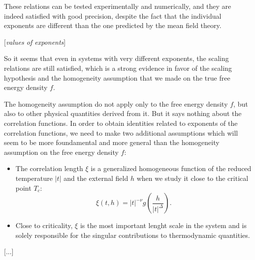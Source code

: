 These relations can be tested experimentally and numerically, and they are indeed satisfied with good precision, despite the fact that the individual exponents are different than the one predicted by the mean field theory.

    [\textit{values of exponents}]

So it seems that even in systems with very different exponents, the scaling relations are still satisfied, which is a strong evidence in favor of the scaling hypothesis and the homogeneity assumption that we made on the true free energy density \(f\).

The homogeneity assumption do not apply only to the free energy density \(f\), but also to other physical quantities derived from it. But it says nothing about the correlation functions. In order to obtain identities related to exponents of the correlation functions, we need to make two additional assumptions which will seem to be more foundamental and more general than the homogeneity assumption on the free energy density \(f\):
\begin{itemize}
    \item The correlation length \(\xi\) is a generalized homogeneous function of the reduced temperature \(\vert t \vert\) and the external field \(h\) when we study it close to the critical point \(T_c\):
          \[
              \xi(t,h) = \vert t \vert^{-\nu} g\left(\frac{h}{\vert t \vert^{\Delta}}\right).
          \]
    \item Close to criticality, \(\xi\) is the most important lenght scale in the system and is solely responsible for the singular contributions to thermodynamic quantities.
\end{itemize}

[...]

